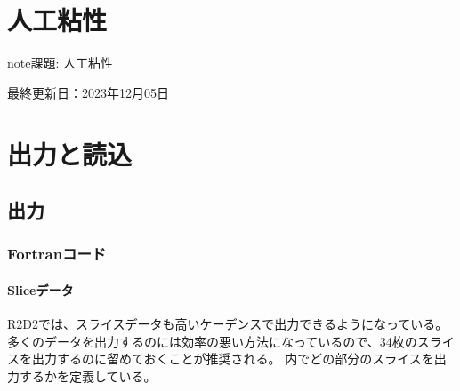 \documentclass[letterpaper,10pt,dvipdfmx,report]{sphinxmanual}
\begin{document}
\sphinxstepscope


\chapter{人工粘性}
\label{\detokenize{artdif:id1}}\label{\detokenize{artdif::doc}}
\begin{sphinxadmonition}{note}{\label{\detokenize{artdif:id2}}課題:}
\sphinxAtStartPar
人工粘性
\end{sphinxadmonition}

\sphinxAtStartPar
最終更新日：2023年12月05日

\sphinxstepscope


\chapter{出力と読込}
\label{\detokenize{io:id1}}\label{\detokenize{io::doc}}

\section{出力}
\label{\detokenize{io:id2}}

\subsection{Fortranコード}
\label{\detokenize{io:fortran}}

\subsubsection{Sliceデータ}
\label{\detokenize{io:slice}}
\sphinxAtStartPar
R2D2では、スライスデータも高いケーデンスで出力できるようになっている。多くのデータを出力するのには効率の悪い方法になっているので、3\sphinxhyphen{}4枚のスライスを出力するのに留めておくことが推奨される。  内でどの部分のスライスを出力するかを定義している。

\begin{sphinxVerbatim}[commandchars=\\\{\}]
\end{sphinxVerbatim}
\end{document}
